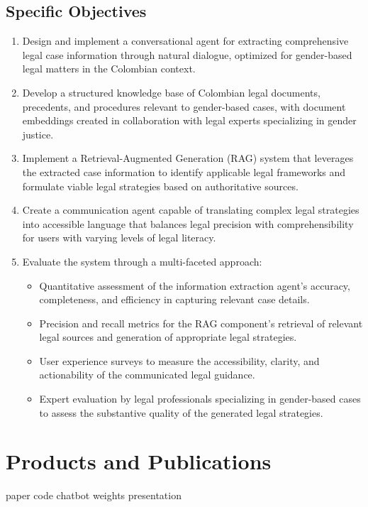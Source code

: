\subsection{Specific Objectives}
\begin{enumerate}
    \item Design and implement a conversational agent for extracting comprehensive legal case information through natural dialogue, optimized for gender-based legal matters in the Colombian context.
    
    \item Develop a structured knowledge base of Colombian legal documents, precedents, and procedures relevant to gender-based cases, with document embeddings created in collaboration with legal experts specializing in gender justice.
    
    \item Implement a Retrieval-Augmented Generation (RAG) system that leverages the extracted case information to identify applicable legal frameworks and formulate viable legal strategies based on authoritative sources.
    
    \item Create a communication agent capable of translating complex legal strategies into accessible language that balances legal precision with comprehensibility for users with varying levels of legal literacy.
    
    \item Evaluate the system through a multi-faceted approach:
    \begin{itemize}
        \item Quantitative assessment of the information extraction agent's accuracy, completeness, and efficiency in capturing relevant case details.
        \item Precision and recall metrics for the RAG component's retrieval of relevant legal sources and generation of appropriate legal strategies.
        \item User experience surveys to measure the accessibility, clarity, and actionability of the communicated legal guidance.
        \item Expert evaluation by legal professionals specializing in gender-based cases to assess the substantive quality of the generated legal strategies.
    \end{itemize}
\end{enumerate}

\section{Products and Publications}
paper 
code
chatbot
weights
presentation
\endinput